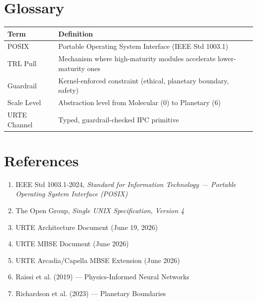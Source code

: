 \documentclass[11pt,a4paper]{report}
\begin{document}
\chapter{Glossary}

\begin{tabular}{ll}
\toprule
\textbf{Term} & \textbf{Definition} \\
\midrule
POSIX & Portable Operating System Interface (IEEE Std 1003.1) \\
TRL Pull & Mechanism where high-maturity modules accelerate lower-maturity ones \\
Guardrail & Kernel-enforced constraint (ethical, planetary boundary, safety) \\
Scale Level & Abstraction level from Molecular (0) to Planetary (6) \\
URTE Channel & Typed, guardrail-checked IPC primitive \\
\bottomrule
\end{tabular}

\chapter{References}

\begin{enumerate}
    \item IEEE Std 1003.1-2024, \textit{Standard for Information Technology — Portable Operating System Interface (POSIX)}
    \item The Open Group, \textit{Single UNIX Specification, Version 4}
    \item URTE Architecture Document (June 19, 2026)
    \item URTE MBSE Document (June 2026)
    \item URTE Arcadia/Capella MBSE Extension (June 2026)
    \item Raissi et al. (2019) — Physics-Informed Neural Networks
    \item Richardson et al. (2023) — Planetary Boundaries
\end{enumerate}
\end{document}
